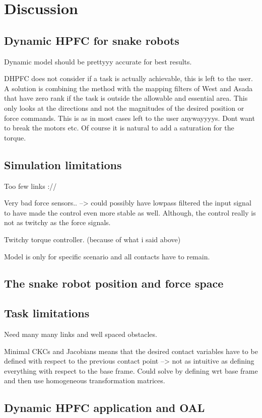 \chapter{Discussion}\label{ch:discussion}


\section{Dynamic HPFC for snake robots}

Dynamic model should be prettyyy accurate for best results.

DHPFC does not consider if a task is actually achievable, this is left to the user. A solution is combining the method with the mapping filters of West and Asada that have zero rank if the task is outside the allowable and essential area. This only looks at the directions and not the magnitudes of the desired position or force commands. This is as in most cases left to the user anywayyyys. Dont want to break the motors etc. Of course it is natural to add a saturation for the torque.

\section{Simulation limitations}

Too few links ://

Very bad force sensors.. --> could possibly have lowpass filtered the input signal to have made the control even more stable as well. Although, the control really is not as twitchy as the force signals.

Twitchy torque controller. (because of what i said above)

Model is only for specific scenario and all contacts have to remain.

\section{The snake robot position and force space}

\section{Task limitations}

Need many many links and well spaced obstacles.

Minimal CKCs and Jacobians means that the desired contact variables have to be defined with respect to the previous contact point --> not as intuitive as defining everything with respect to the base frame. Could solve by defining wrt base frame and then use homogeneous transformation matrices.

\section{Dynamic HPFC application and OAL}
